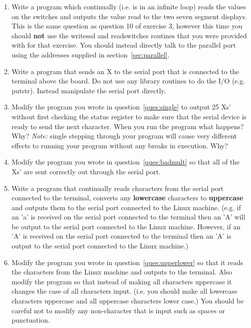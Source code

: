 \documentclass[a4paper,10pt]{article}
\begin{document}
\begin{enumerate}

\item Write a program which continually (i.e. is in an infinite loop)
reads the values on the switches and outputs the value read to the two
seven segment displays. This is the same question as question 10 of
exercise 3, however this time you should \textbf{not} use the writessd
and readswitches routines that you were provided with for that
exercise. You should instead directly talk to the parallel port using
the addresses supplied in section~\ref{sec:parallel}.

\item 
\label{ques:single}

Write a program that sends an X to the serial port that is
connected to the terminal above the board. Do not use any library
routines to do the I/O (e.g. putstr). Instead manipulate the serial
port directly.

\item 
\label{ques:badmult}
Modify the program you wrote in question~\ref{ques:single} to output
25 Xs' without first checking the status register to make sure that
the serial device is ready to send the next character. When you run
the program what happens?  Why? \textit{Note:} single stepping through
your program will cause very different effects to running your program
without any breaks in execution. Why?

\item Modify the program you wrote in question~\ref{ques:badmult} so
that all of the Xs' are sent correctly out through the serial port.

\item 
\label{ques:upperlower}
Write a program that continually reads characters from the serial port
connected to the terminal, converts any \textbf{lowercase} characters
to \textbf{uppercase} and outputs them to the serial port connected to
the Linux machine. (e.g. if an 'a' is received on the serial port
connected to the terminal then an 'A' will be output to the serial
port connected to the Linux machine. However, if an 'A' is received on
the serial port connected to the terminal then an 'A' is output to the
serial port connected to the Linux machine.)

\item 
\label{ques:switchcase}
Modify the program you wrote in question~\ref{ques:upperlower} so that
it reads the characters from the Linux machine and outputs to the
terminal. Also modify the program so that instead of making all
characters uppercase it changes the case of all characters
input. (i.e. you should make all lowercase characters uppercase and
all uppercase characters lower case.) You should be careful not to
modify any non-character that is input such as spaces or punctuation.


\end{enumerate}
\end{document}
